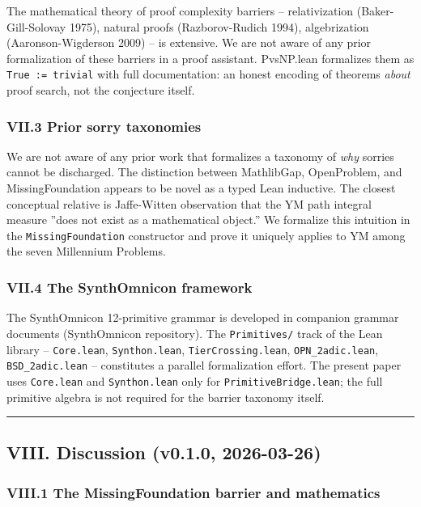 \documentclass[12pt,a4paper]{article}
\begin{document}
The mathematical theory of proof complexity barriers  --  relativization (Baker-Gill-Solovay 1975), natural proofs (Razborov-Rudich 1994), algebrization (Aaronson-Wigderson 2009)  --  is extensive. We are not aware of any prior formalization of these barriers in a proof assistant. PvsNP.lean formalizes them as \texttt{True := trivial} with full documentation: an honest encoding of theorems \emph{about} proof search, not the conjecture itself.

\subsubsection{VII.3 Prior sorry taxonomies}

We are not aware of any prior work that formalizes a taxonomy of \emph{why} sorries cannot be discharged. The distinction between MathlibGap, OpenProblem, and MissingFoundation appears to be novel as a typed Lean inductive. The closest conceptual relative is Jaffe-Witten observation that the YM path integral measure ''does not exist as a mathematical object.'' We formalize this intuition in the \texttt{MissingFoundation} constructor and prove it uniquely applies to YM among the seven Millennium Problems.

\subsubsection{VII.4 The SynthOmnicon framework}

The SynthOmnicon 12-primitive grammar is developed in companion grammar documents (SynthOmnicon repository). The \texttt{Primitives/} track of the Lean library  --  \texttt{Core.lean}, \texttt{Synthon.lean}, \texttt{TierCrossing.lean}, \texttt{OPN\_2adic.lean}, \texttt{BSD\_2adic.lean}  --  constitutes a parallel formalization effort. The present paper uses \texttt{Core.lean} and \texttt{Synthon.lean} only for \texttt{PrimitiveBridge.lean}; the full primitive algebra is not required for the barrier taxonomy itself.

\begin{center}
\rule{0.5\textwidth}{0.4pt}
\end{center}

\subsection{VIII. Discussion (v0.1.0, 2026-03-26)}

\subsubsection{VIII.1 The MissingFoundation barrier and mathematics}
\end{document}
